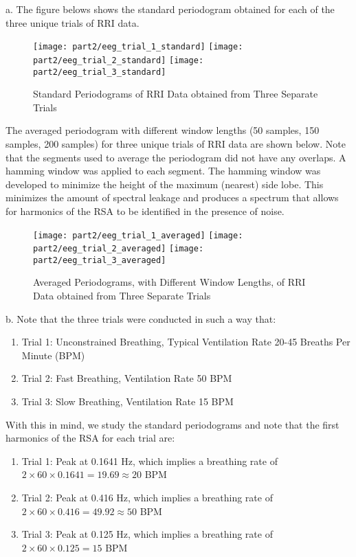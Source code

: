\noindent{}a. The figure belows shows the standard periodogram obtained for each of the three unique trials of RRI data.

\begin{figure}[H]
\centering{}
\texttt{[image: part2/eeg\_trial\_1\_standard]}
\texttt{[image: part2/eeg\_trial\_2\_standard]}
\texttt{[image: part2/eeg\_trial\_3\_standard]}
\caption{Standard Periodograms of RRI Data obtained from Three Separate Trials}
\end{figure}

\noindent{}The averaged periodogram with different window lengths (50 samples, 150 samples, 200 samples) for three unique trials of RRI data are shown below. Note that the segments used to average the periodogram did not have any overlaps. A hamming window was applied to each segment. The hamming window was developed to minimize the height of the maximum (nearest) side lobe. This minimizes the amount of spectral leakage and produces a spectrum that allows for harmonics of the RSA to be identified in the presence of noise.

\begin{figure}[H]
\centering{}
\texttt{[image: part2/eeg\_trial\_1\_averaged]}
\texttt{[image: part2/eeg\_trial\_2\_averaged]}
\texttt{[image: part2/eeg\_trial\_3\_averaged]}
\caption{Averaged Periodograms, with Different Window Lengths, of RRI Data obtained from Three Separate Trials}
\end{figure}

\noindent{}b. Note that the three trials were conducted in such a way that:
\begin{enumerate}
\item Trial 1: Unconstrained Breathing, Typical Ventilation Rate 20-45 Breaths Per Minute (BPM)
\item Trial 2: Fast Breathing, Ventilation Rate 50 BPM
\item Trial 3: Slow Breathing, Ventilation Rate 15 BPM
\end{enumerate}

\noindent{}With this in mind, we study the standard periodograms and note that the first harmonics of the RSA for each trial are:
\begin{enumerate}
\item Trial 1: Peak at 0.1641 Hz, which implies a breathing rate of $2 \times 60 \times 0.1641 = 19.69 \approx 20$ BPM
\item Trial 2: Peak at 0.416 Hz, which implies a breathing rate of $2 \times 60 \times 0.416 = 49.92 \approx 50$ BPM
\item Trial 3: Peak at 0.125 Hz, which implies a breathing rate of $2  \times 60 \times 0.125 = 15$ BPM
\end{enumerate}

